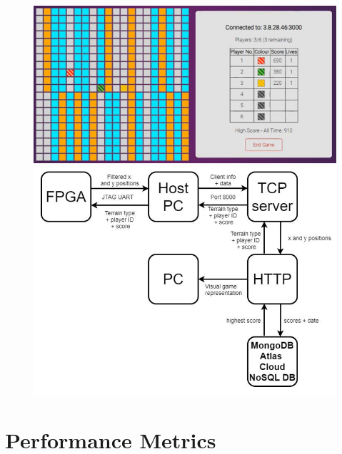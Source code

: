 \documentclass[12pt,a4paper]{article}
\begin{document}
\begin{figure} [h!]
    \includegraphics[scale = 0.4]{Website.png}
    \includegraphics[scale = 0.3]{Arch.png}
\end{figure}
\par

\section{\small Performance Metrics}
\end{document}
